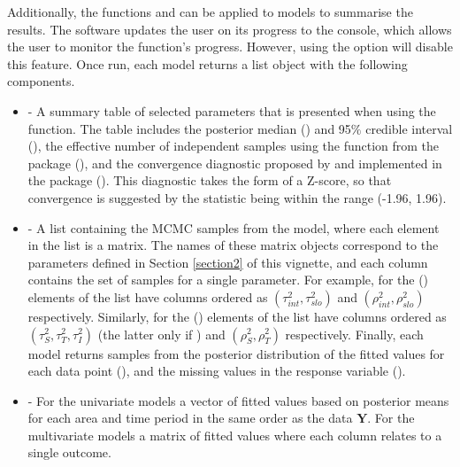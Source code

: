 \documentclass[article, nojss]{jss}
\begin{document}
Additionally, the  functions  and  can  be applied to  models to summarise the results. The software updates the user on its progress to the  console, which allows the user to monitor the function's progress. However, using the  option will disable this feature. Once run, each model returns a list object with the following components. 


\begin{itemize}
\item {} - A summary table of selected parameters that is presented when using the  function. The table includes the posterior median () and 95$\%$ credible interval (),  the effective number of independent samples using the   function from the  package (), and the convergence  diagnostic proposed by \cite{geweke1992} and implemented in the  package (). This diagnostic takes the form of a Z-score, so that convergence is suggested by the statistic being within the range (-1.96, 1.96).

\item {} - A list containing the MCMC samples from the model, where each element in the list is a matrix. The names of these matrix objects correspond to the parameters defined in Section \ref{section2} of this vignette, and each column contains the set of samples for a single parameter.  For example, for  the () elements of the list have columns ordered as $(\tau^2_{int}, \tau^2_{slo})$ and $(\rho^2_{int}, \rho^2_{slo})$ respectively. Similarly, for   the () elements of the list have columns ordered as $(\tau^2_{S}, \tau^2_{T}, \tau^2_{I})$ (the latter only if ) and $(\rho^2_{S}, \rho^2_{T})$ respectively. Finally, each model returns samples from the posterior distribution of the fitted values for each data point (), and the missing values in the response variable ().

\item {} - For the univariate models a vector of fitted values based on posterior means for each area and time period in the same order as the data $\mathbf{Y}$. For the multivariate models a matrix of fitted values where each column relates to a single outcome. 


\end{itemize}
\end{document}
